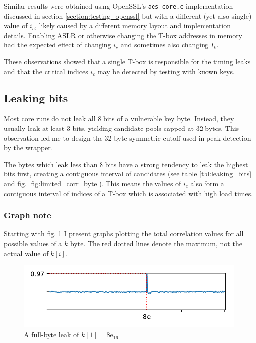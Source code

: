\documentclass[thesis=B,english]{FITthesis}[2019/03/06]
\begin{document}
Similar results were obtained using OpenSSL's \verb'aes_core.c' implementation discussed in section \ref{section:testing_openssl} but with a different (yet also single) value of $i_c$, likely caused by a different memory layout and implementation details.
Enabling ASLR or otherwise changing the T-box addresses in memory had the expected effect of changing $i_c$ and sometimes also changing $I_k$.

These observations showed that a single T-box is responsible for the timing leaks and that the critical indices $i_c$ may be detected by testing with known keys.

\subsection{Leaking bits}
\label{section:bits}
Most core runs do not leak all 8 bits of a vulnerable key byte. Instead, they usually leak at least 3 bits, yielding candidate pools capped at 32 bytes.
This observation led me to design the 32-byte symmetric cutoff used in peak detection by the wrapper.

The bytes which leak less than 8 bits have a strong tendency to leak the highest bits first, creating a contiguous interval of candidates (see table \ref{tbl:leaking_bits} and fig. \ref{fig:limited_corr_byte}).
This means the values of $i_c$ also form a contiguous interval of indices of a T-box which is associated with high load times.

\subsubsection*{Graph note}
Starting with fig. \ref{fig:perfect_corr_byte} I present graphs plotting the total correlation values for all possible values of a $k$ byte.
The red dotted lines denote the maximum, not the actual value of $k[i]$.

\begin{figure}[h]
	\centering
	\includegraphics{superstrong_key_8e.pdf}
	\caption{A full-byte leak of $k[1] = \text{8e}_{16}$}
	\label{fig:perfect_corr_byte}
\end{figure}
\end{document}
